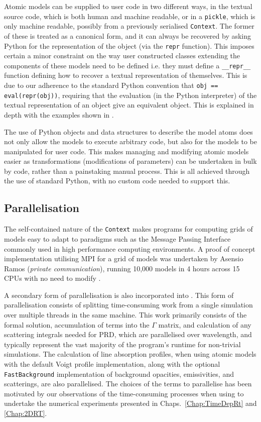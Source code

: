 Atomic models can be supplied to user code in two different ways, in the textual source code, which is both human and machine readable, or in a \texttt{pickle}, which is only machine readable, possibly from a previously serialised \texttt{Context}.
The former of these is treated as a canonical form, and it can always be recovered by asking Python for the representation of the object (via the \texttt{repr} function).
This imposes certain a minor constraint on the way user constructed classes extending the components of these models need to be defined i.e. they must define a \texttt{\_\_repr\_\_} function defining how to recover a textual representation of themselves.
This is due to our adherence to the standard Python convention that \texttt{obj == eval(repr(obj))}, requiring that the evaluation (in the Python interpreter) of the textual representation of an object give an equivalent object.
This is explained in depth with the examples shown in \citet{Osborne2021}.

The use of Python objects and data structures to describe the model atoms does not only allow the models to execute arbitrary code, but also for the models to be manipulated for user code.
This makes managing and modifying atomic models easier as transformations (modifications of parameters) can be undertaken in bulk by code, rather than a painstaking manual process.
This is all achieved through the use of standard Python, with no custom code needed to support this.

\subsection{Parallelisation}\label{Sec:LwParallelisation}

The self-contained nature of the \texttt{Context} makes \Lw{} programs for computing grids of models easy to adapt to paradigms such as the Message Passing Interface \citep[MPI, e.g.][for an overview of the MPICH implementation]{Gropp1996} commonly used in high performance computing environments.
A proof of concept implementation utilising MPI for a grid of models was undertaken by Asensio Ramos (\emph{private communication}), running 10,000 models in 4 hours across 15 CPUs with no need to modify \Lw{}.

A secondary form of parallelisation is also incorporated into \Lw{}.
This form of parallelisation consists of splitting time-consuming work from a single simulation over multiple threads in the same machine.
This work primarily consists of the formal solution, accumulation of terms into the $\Gamma$ matrix, and calculation of any scattering integrals needed for PRD, which are parallelised over wavelength, and typically represent the vast majority of the program's runtime for non-trivial simulations.
The calculation of line absorption profiles, when using atomic models with the default Voigt profile implementation, along with the optional \texttt{FastBackground} implementation of background opacities, emissivities, and scatterings, are also parallelised.
The choices of the terms to parallelise has been motivated by our observations of the time-consuming processes when using \Lw{} to undertake the numerical experiments presented in Chaps.~\ref{Chap:TimeDepRt} and \ref{Chap:2DRT}.

